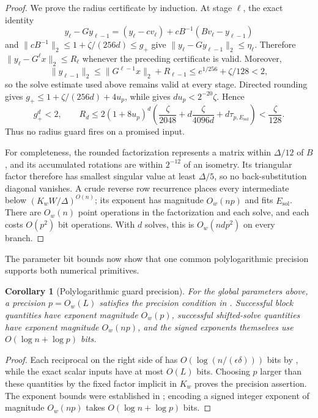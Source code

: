 \documentclass[11pt]{article}
\newtheorem{corollary}[lemma]{Corollary}
\begin{document}
\begin{proof}
We prove the radius certificate by induction.  At stage $\ell$, the exact
identity
\[
 y_\ell-Gy_{\ell-1}
 =(y_\ell-cv_\ell)+cB^{-1}(Bv_\ell-y_{\ell-1})
\]
and $\lVert cB^{-1}\rVert_2\leq1+\zeta/(256d)\leq g_+$ give
$\lVert y_\ell-Gy_{\ell-1}\rVert_2\leq\eta_\ell$.  Therefore
$\lVert y_\ell-G^\ell x\rVert_2\leq R_\ell$ whenever the preceding
certificate is valid.  Moreover,
\[
 \lVert y_{\ell-1}\rVert_2
 \leq\lVert G^{\ell-1}x\rVert_2+R_{\ell-1}
 \leq e^{1/256}+\zeta/128<2,
\]
so the solve estimate used above remains valid at every stage.  Directed
rounding gives $g_+\leq1+\zeta/(256d)+4u_p$, while
 gives $du_p<2^{-20}\zeta$.  Hence
\[
 g_+^d<2,
 \qquad
 R_d\leq2(1+8u_p)^d
 \left(\frac{\zeta}{2048}
 +d\frac{\zeta}{4096d}
 +d\tau_{p,E_{\mathrm{sol}}}\right)
 <\frac{\zeta}{128}.
\]
Thus no radius guard fires on a promised input.

For completeness, the rounded factorization represents a matrix within
$\Delta/12$ of $B$, and its accumulated rotations are within $2^{-12}$ of
an isometry.  Its triangular factor therefore has smallest singular value at
least $\Delta/5$, so no back-substitution diagonal vanishes.  A crude reverse
row recurrence places every intermediate below
$(K_wW/\Delta)^{O(n)}$; its exponent has magnitude $O_w(np)$ and fits
$E_{\mathrm{sol}}$.  There are $O_w(n)$ point operations in the
factorization and each solve, and each costs $O(p^2)$ bit operations.  With
$d$ solves, this is $O_w(ndp^2)$ on every branch.
\end{proof}

The parameter bit bounds now show that one common polylogarithmic precision
supports both numerical primitives.

\begin{corollary}[Polylogarithmic guard precision]
\label{cor:primitive-precision}
For the global parameters above, a precision
$p=O_w(L)$ satisfies the precision condition in
.  Successful block quantities have exponent
magnitude $O_w(p)$, successful shifted-solve quantities have exponent
magnitude $O_w(np)$, and the signed exponents themselves use
$O(\log n+\log p)$ bits.
\end{corollary}

\begin{proof}
Each reciprocal on the right side of  has
$O(\log(n/(\epsilon\delta)))$ bits by , while the
exact scalar inputs have at most $O(L)$ bits.  Choosing $p$ larger than these
quantities by the fixed factor implicit in $K_w$ proves the precision
assertion.  The exponent bounds were established
in ; encoding a signed
integer exponent of magnitude $O_w(np)$ takes
$O(\log n+\log p)$ bits.
\end{proof}
\end{document}
